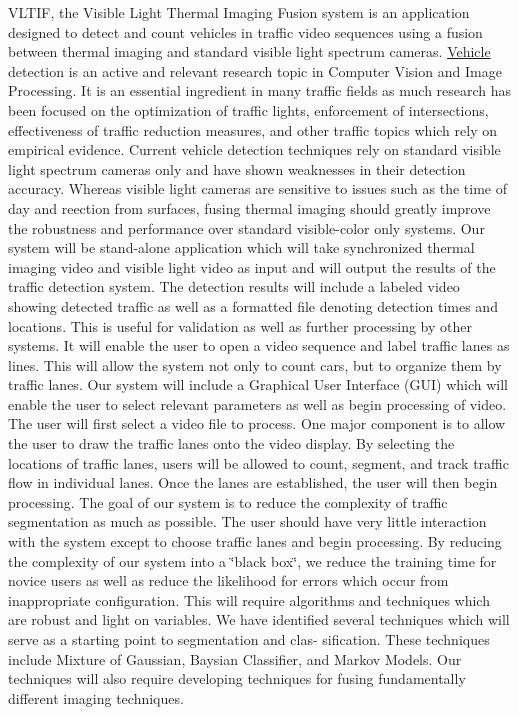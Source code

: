 \-V\-L\-T\-I\-F, the \-Visible \-Light \-Thermal \-Imaging \-Fusion system is an application designed to detect and count vehicles in traffic video sequences using a fusion between thermal imaging and standard visible light spectrum cameras. \hyperlink{class_vehicle}{\-Vehicle} detection is an active and relevant research topic in \-Computer \-Vision and \-Image \-Processing. \-It is an essential ingredient in many traffic fields as much research has been focused on the optimization of traffic lights, enforcement of intersections, effectiveness of traffic reduction measures, and other traffic topics which rely on empirical evidence. \-Current vehicle detection techniques rely on standard visible light spectrum cameras only and have shown weaknesses in their detection accuracy. \-Whereas visible light cameras are sensitive to issues such as the time of day and reection from surfaces, fusing thermal imaging should greatly improve the robustness and performance over standard visible-\/color only systems. \-Our system will be stand-\/alone application which will take synchronized thermal imaging video and visible light video as input and will output the results of the traffic detection system. \-The detection results will include a labeled video showing detected traffic as well as a formatted file denoting detection times and locations. \-This is useful for validation as well as further processing by other systems. \-It will enable the user to open a video sequence and label traffic lanes as lines. \-This will allow the system not only to count cars, but to organize them by traffic lanes. \-Our system will include a \-Graphical \-User \-Interface (\-G\-U\-I) which will enable the user to select relevant parameters as well as begin processing of video. \-The user will first select a video file to process. \-One major component is to allow the user to draw the traffic lanes onto the video display. \-By selecting the locations of traffic lanes, users will be allowed to count, segment, and track traffic flow in individual lanes. \-Once the lanes are established, the user will then begin processing. \-The goal of our system is to reduce the complexity of traffic segmentation as much as possible. \-The user should have very little interaction with the system except to choose traffic lanes and begin processing. \-By reducing the complexity of our system into a \char`\"{}black box\char`\"{}, we reduce the training time for novice users as well as reduce the likelihood for errors which occur from inappropriate configuration. \-This will require algorithms and techniques which are robust and light on variables. \-We have identified several techniques which will serve as a starting point to segmentation and clas-\/ sification. \-These techniques include \-Mixture of \-Gaussian, \-Baysian \-Classifier, and \-Markov \-Models. \-Our techniques will also require developing techniques for fusing fundamentally different imaging techniques. 